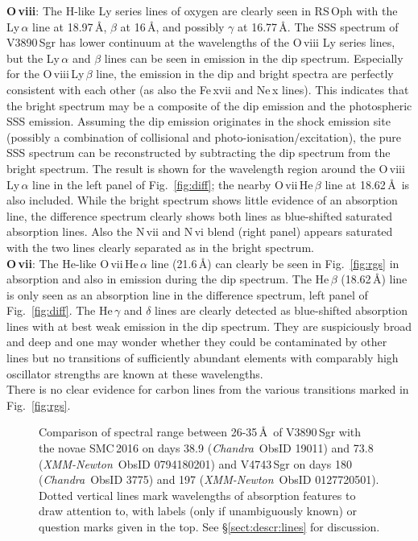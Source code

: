 \documentclass{aa}
\newcommand{\chandra}{{\it Chandra}}
\newcommand{\xmm}{{\it XMM-Newton}}
\begin{document}
\noindent
{\bf O\,{\sc viii}}: The H-like Ly series lines of oxygen are clearly
seen in RS\,Oph with the Ly\,$\alpha$ line at 18.97\,\AA, $\beta$ at 16\,\AA,
and possibly $\gamma$ at 16.77\,\AA. The SSS spectrum of V3890\,Sgr has
lower continuum at the wavelengths of the O\,{\sc viii} Ly
series lines, but the Ly\,$\alpha$ and $\beta$ lines can be seen in
emission in the dip spectrum. Especially for the O\,{\sc viii}\,Ly\,$\beta$
line, the emission in the dip and bright spectra are perfectly consistent
with each other (as also the Fe\,{\sc xvii} and Ne\,{\sc x} lines).
This indicates that the bright spectrum may be a composite
of the dip emission and the photospheric SSS emission. Assuming the dip
emission originates in the shock emission site (possibly a combination
of collisional and photo-ionisation/excitation), the pure SSS spectrum
can be reconstructed by subtracting the dip spectrum from the bright
spectrum. The result is shown for the wavelength region around the
O\,{\sc viii}\,Ly\,$\alpha$ line in the left panel of
Fig.~\ref{fig:diff}; the nearby O\,{\sc vii}\,He\,$\beta$ line at 18.62\,\AA\
is also included. While the bright spectrum shows little evidence of
an absorption line, the difference spectrum clearly shows both lines
as blue-shifted saturated absorption lines. Also the N\,{\sc vii} and
N\,{\sc vi} blend (right panel) appears saturated with the two lines
clearly separated as in the bright spectrum.\\

\noindent
{\bf O\,{\sc vii}}: The He-like O\,{\sc vii}\,He\,$\alpha$ line (21.6\,\AA) can
clearly be seen in Fig.~\ref{fig:rgs} in absorption and also in emission
during the dip spectrum. The He\,$\beta$ (18.62\,\AA) line is only seen as
an absorption line in the difference spectrum, left panel of
Fig.~\ref{fig:diff}. The He\,$\gamma$ and $\delta$ lines are clearly detected
as blue-shifted absorption lines with at best weak emission in the dip
spectrum. They are suspiciously broad and deep and one may wonder whether
they could be contaminated by other lines but no transitions of sufficiently
abundant elements with comparably high oscillator strengths are known
at these wavelengths.\\

\noindent
There is no clear evidence for carbon lines from the various transitions
marked in Fig.~\ref{fig:rgs}.\\

\begin{figure}[!ht]
\caption{\label{fig:unknown}Comparison of spectral range between 26-35\,\AA\
of V3890\,Sgr with the novae SMC\,2016 on days 38.9 (\chandra\ Obs\-ID 19011) and
73.8 (\xmm\ ObsID 0794180201) and V4743\,Sgr on days 180
(\chandra\ Obs\-ID 3775) and 197 (\xmm\ ObsID 0127720501). Dotted
vertical lines mark wavelengths of absorption features to draw attention
to, with labels (only if unambiguously known) or question marks given in
the top. See \S\ref{sect:descr:lines} for discussion.
}
\end{figure}
\end{document}

